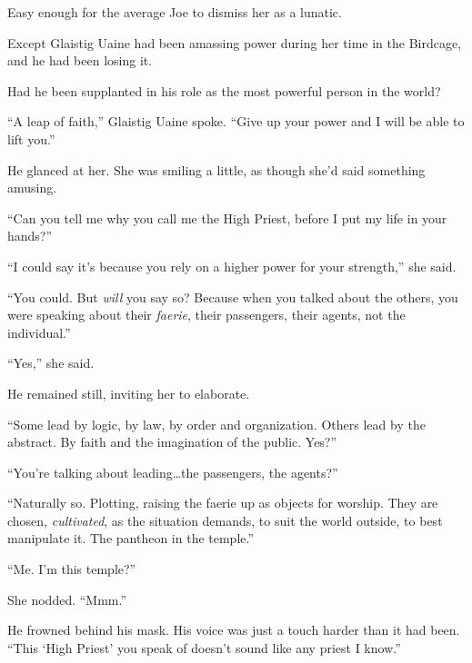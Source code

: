 Easy enough for the average Joe to dismiss her as a lunatic.



Except Glaistig Uaine had been amassing power during her time in the Birdcage, and he had been losing it.



Had he been supplanted in his role as the most powerful person in the world?



``A leap of faith,'' Glaistig Uaine spoke.  ``Give up your power and I will be able to lift you.''



He glanced at her.  She was smiling a little, as though she'd said something amusing.



``Can you tell me why you call me the High Priest, before I put my life in your hands?''



``I could say it's because you rely on a higher power for your strength,'' she said.



``You could.  But \emph{will} you say so?  Because when you talked about the others, you were speaking about their \emph{faerie}, their passengers, their agents, not the individual.''



``Yes,'' she said.



He remained still, inviting her to elaborate.



``Some lead by logic, by law, by order and organization.  Others lead by the abstract.  By faith and the imagination of the public.  Yes?''



``You're talking about leading\ldots the passengers, the agents?''



``Naturally so.  Plotting, raising the faerie up as objects for worship.  They are chosen, \emph{cultivated}, as the situation demands, to suit the world outside, to best manipulate it.  The pantheon in the temple.''



``Me.  I'm this temple?''



She nodded.  ``Mmm.''



He frowned behind his mask.  His voice was just a touch harder than it had been.  ``This `High Priest' you speak of doesn't sound like any priest I know.''



